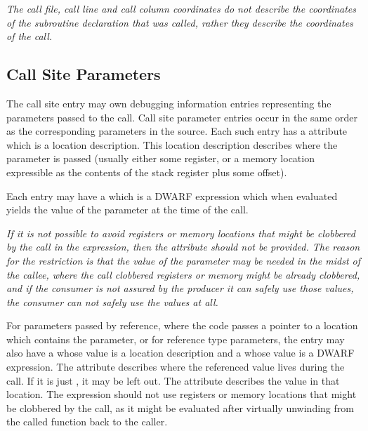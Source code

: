 \textit{The call file, call line and call column coordinates do
not describe the coordinates of the subroutine declaration that
was called, rather they describe the coordinates of the call.}

\subsection{Call Site Parameters}
\label{chap:callsiteparameters}
The call site entry may own
\DWTAGcallsiteparameterTARG{}
debugging information entries representing the parameters passed
to the call.
Call site parameter entries occur in the same order as the
corresponding parameters in the source.
Each such entry has a \DWATlocation{} attribute which is a location
description. This location description
describes where the parameter is passed
(usually either some register, or a memory location expressible as
the contents of the stack register plus some offset).

Each \DWTAGcallsiteparameter{} entry may have a
\DWATcallvalueDEFN{}
which is a DWARF expression
which when evaluated yields the value of the parameter at the time of the call.

\textit{If it is not
possible to avoid registers or memory locations that might be clobbered by
the call in the expression, then the \DWATcallvalueNAME{} attribute should
not be provided. The reason for the restriction is that the value of the parameter may be
needed in the midst of the callee, where the call clobbered registers or
memory might be already clobbered, and if the consumer is not assured by
the producer it can safely use those values, the consumer can not safely
use the values at all.}

For parameters passed by reference, where the code passes a pointer to
a location which contains the parameter, or for reference type parameters,
the \DWTAGcallsiteparameter{} entry may also have a
\DWATcalldatalocationDEFN{}
whose value is a location description and a
\DWATcalldatavalueDEFN{}
whose value is a DWARF expression.  The \DWATcalldatalocationNAME{} attribute
describes where the referenced value lives during the call.  If it is just
\DWOPpushobjectaddress{}, it may be left out.  The
\DWATcalldatavalueNAME{} attribute describes the value in that location.
The expression should not use registers or memory
locations that might be clobbered by the call, as it might be evaluated after
virtually unwinding from the called function back to the caller.


